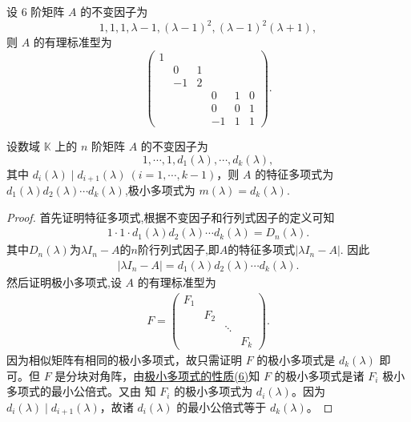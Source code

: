 \documentclass[../../main.tex]{subfiles}
\begin{document}
\begin{example}
设 6 阶矩阵 $A$ 的不变因子为
\[
1,1,1,\lambda - 1,(\lambda - 1)^2,(\lambda - 1)^2(\lambda + 1),
\]
则 $A$ 的有理标准型为
\[
\begin{pmatrix}
1 & & & & & \\
& 0 & 1 & & & \\
& -1 & 2 & & & \\
& & & 0 & 1 & 0 \\
& & & 0 & 0 & 1 \\
& & & -1 & 1 & 1
\end{pmatrix}.
\] 
\end{example}

\begin{theorem}\label{theorem:极小多项式与不变因子的关系}
设数域 $\mathbb{K}$ 上的 $n$ 阶矩阵 $A$ 的不变因子为
\[
1,\cdots,1,d_1(\lambda),\cdots,d_k(\lambda),
\]
其中 $d_i(\lambda)\mid d_{i + 1}(\lambda)\ (i = 1,\cdots,k - 1)$，则 $A$ 的特征多项式为$d_1(\lambda)d_2(\lambda)\cdots d_k(\lambda)$,极小多项式为 $m(\lambda)=d_k(\lambda)$.
\end{theorem}
\begin{proof}
首先证明特征多项式,根据不变因子和行列式因子的定义可知
\begin{align*}
1\cdot 1\cdot d_1(\lambda)d_2(\lambda)\cdots d_k(\lambda)=D_n(\lambda).
\end{align*}
其中$D_n(\lambda)$为$\lambda I_n-A$的$n$阶行列式因子,即$A$的特征多项式$|\lambda I_n-A|$.
因此
\begin{align*}
|\lambda I_n-A|=d_1(\lambda)d_2(\lambda)\cdots d_k(\lambda).
\end{align*}
然后证明极小多项式,设 $A$ 的有理标准型为
\begin{align*}
F = \begin{pmatrix}
F_1 & & & \\
& F_2 & & \\
& & \ddots & \\
& & & F_k
\end{pmatrix}.
\end{align*}
因为相似矩阵有相同的极小多项式，故只需证明 $F$ 的极小多项式是 $d_k(\lambda)$ 即可。但 $F$ 是分块对角阵，由\hyperref[proposition:极小多项式的性质]{极小多项式的性质(6)}知 $F$ 的极小多项式是诸 $F_i$ 极小多项式的最小公倍式。又由 知 $F_i$ 的极小多项式为 $d_i(\lambda)$。因为 $d_i(\lambda)\mid d_{i + 1}(\lambda)$，故诸 $d_i(\lambda)$ 的最小公倍式等于 $d_k(\lambda)$。
\end{proof}
\end{document}
